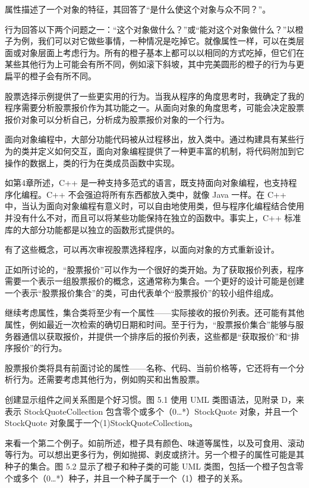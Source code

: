 属性描述了一个对象的特征，其回答了“是什么使这个对象与众不同？”。


行为回答以下两个问题之一：“这个对象做什么？”或“能对这个对象做什么？”以橙子为例，我们可以对它做些事情，一种情况是吃掉它。就像属性一样，可以在类层面或对象层面上考虑行为。所有的橙子基本上都可以以相同的方式吃掉，但它们在某些其他行为上可能会有所不同，例如滚下斜坡，其中完美圆形的橙子的行为与更扁平的橙子会有所不同。

股票选择示例提供了一些更实用的行为。当我从程序的角度思考时，我确定了我的程序需要分析股票报价作为其功能之一。从面向对象的角度思考，可能会决定股票报价对象可以分析自己，分析成为股票报价对象的一个行为。

面向对象编程中，大部分功能代码被从过程移出，放入类中。通过构建具有某些行为的类并定义如何交互，面向对象编程提供了一种更丰富的机制，将代码附加到它操作的数据上，类的行为在类成员函数中实现。

如第4章所述，C++ 是一种支持多范式的语言，既支持面向对象编程，也支持程序化编程。C++ 不会强迫将所有东西都放入类中，就像 Java 一样。在 C++ 中，当认为面向对象编程有意义时，可以自由地使用类，但与程序化编程结合使用并没有什么不对，而且可以将某些功能保持在独立的函数中。事实上，C++ 标准库的大部分功能都是以独立的函数形式提供的。


有了这些概念，可以再次审视股票选择程序，以面向对象的方式重新设计。

正如所讨论的，“股票报价”可以作为一个很好的类开始。为了获取报价列表，程序需要一个表示一组股票报价的概念，这通常称为集合。一个更好的设计可能是创建一个表示“股票报价集合”的类，可由代表单个“股票报价”的较小组件组成。

继续考虑属性，集合类将至少有一个属性——实际接收的报价列表。还可能有其他属性，例如最近一次检索的确切日期和时间。至于行为，“股票报价集合”能够与服务器通信以获取报价，并提供一个排序后的报价列表，这些都是“获取报价”和“排序报价”的行为。

股票报价类将具有前面讨论的属性——名称、代码、当前价格等，它还将有一个分析行为。还需要考虑其他行为，例如购买和出售股票。

创建显示组件之间关系图是个好习惯。图 5.1 使用 UML 类图语法，见附录 D，来表示 StockQuoteCollection 包含零个或多个（0…*）StockQuote 对象，并且一个 StockQuote 对象属于一个(1)StockQuoteCollection。


来看一个第二个例子。如前所述，橙子具有颜色、味道等属性，以及可食用、滚动等行为。可以想出更多行为，例如抛掷、剥皮或挤汁。另一个橙子的属性可能是其种子的集合。图 5.2 显示了橙子和种子类的可能 UML 类图，包括一个橙子包含零个或多个（0…*）种子，并且一个种子属于一个（1）橙子的关系。

























